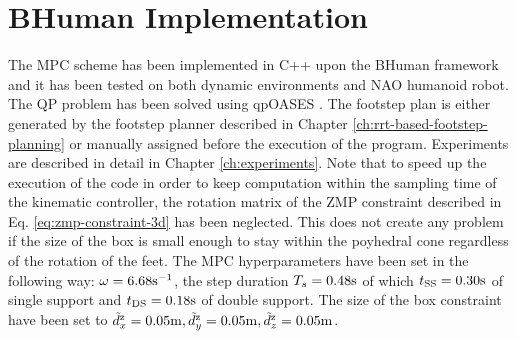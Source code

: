 \section{BHuman Implementation}
The MPC scheme has been implemented in C++ upon the BHuman framework
\cite{BHumanCodeRelease2018} and it has been tested on both dynamic environments 
and NAO humanoid robot. The QP problem has been solved using qpOASES
\cite{qpOASES}. The footstep plan is either generated by the footstep planner 
described in Chapter \ref{ch:rrt-based-footstep-planning} or manually assigned 
before the execution of the program. Experiments are described in detail in 
Chapter \ref{ch:experiments}. Note that to speed up the execution of the code 
in order to keep computation within the sampling time of the kinematic 
controller, the rotation matrix of the ZMP constraint described in Eq.
\eqref{eq:zmp-constraint-3d} has been neglected. This does not create any
problem if the size of the box is small enough to stay within the poyhedral 
cone regardless of the rotation of the feet. The MPC hyperparameters have been 
set in the following way: $\omega=6.68 {\rm s}^{-1}$,
the step duration $T_s=0.48 {\rm s}$ of which $t_{\rm SS}=0.30 {\rm s}$ of
single support and 
$t_{\rm DS}=0.18 {\rm s}$ of double support. The size of the box constraint have 
been set to $\tilde{d}_x^{\rm z}=0.05 {\rm m}, \tilde{d}_y^{\rm z}=0.05 {\rm m},
\tilde{d}_z^{\rm z}=0.05 {\rm m}$.

